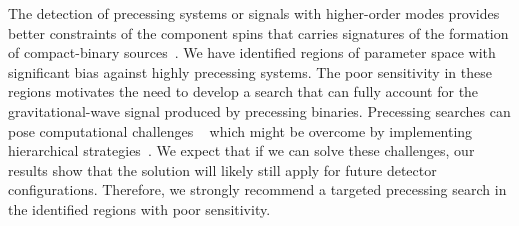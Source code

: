 The detection of precessing systems or signals with higher-order modes provides better constraints of the component spins that carries signatures of the formation of compact-binary sources~\cite{Gompertz:2021xub, Stevenson:2017dlk, Talbot:2017yur, Rodriguez:2016vmx, Johnson-McDaniel:2021rvv}. We have identified regions of parameter space with significant bias against highly precessing systems. The poor sensitivity in these regions motivates the need to develop a search that can fully account for the gravitational-wave signal produced by precessing binaries. Precessing searches can pose computational challenges ~\cite{Harry:2016ijz} which might be overcome by implementing hierarchical strategies~\cite{Dhurkunde:2021csz, Soni:2021vls}. We expect that if we can solve these challenges, our results show that the solution will likely still apply for future detector configurations. Therefore, we strongly recommend a targeted precessing search in the identified regions with poor sensitivity.